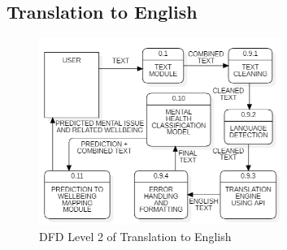 \subsection{Translation to English}

\begin{figure}[h!]  
    \centering
    \includegraphics[width=0.7\textwidth]{Images/DFD L2 TE.png}  
    \caption{DFD Level 2 of Translation to English}
    \label{dfdl111}  %
\end{figure}

